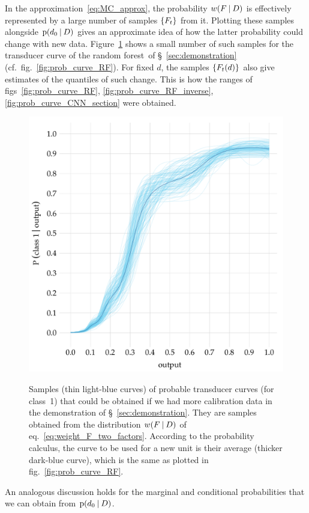 \documentclass[\ifafour a4paper,12pt,\else a5paper,10pt,\fi%
onecolumn,oneside,article,%
british%
]{memoir}
\theoremstyle{remark}
\theoremstyle{innote}
\DeclarePairedDelimiter\set{\{}{\}} %
\newcommand*{\p}{\mathrm{p}}%
\renewcommand*{\|}[1][]{\nonscript\:#1\vert\nonscript\:\mathopen{}}
\newcommand*{\sect}{\S}%
\newcommand*{\eqn}{eq.}%
\newcommand*{\fig}{fig.}%
\newcommand*{\figs}{figs}%
\newcommand*{\cf}{{cf.}}
\newcommand*{\wf}{w}
\newcommand*{\RF}{random forest}
\begin{document}
In the approximation~\eqref{eq:MC_approx}, the probability $\wf(F \| D)$ is effectively represented by a large number of samples $\set{F_{t}}$ from it. Plotting these samples alongside $\p(d_{0} \| D)$ gives an approximate idea of how the latter probability could change with new data. Figure~\ref{fig:prob_curve_RF_samples} shows a small number of such samples for the transducer curve of the \RF\ of \sect~\ref{sec:demonstration} (\cf\ \fig~\ref{fig:prob_curve_RF}). For fixed $d$, the samples $\set{F_{t}(d)}$ also give estimates of the quantiles of such change. This is how the ranges of \figs~\ref{fig:prob_curve_RF}, \ref{fig:prob_curve_RF_inverse}, \ref{fig:prob_curve_CNN_section} were obtained.
%
\begin{figure}[t]
  \centering
  \includegraphics[width=0.75\linewidth]{transducer_curve_RFraw_all.pdf}\\
  \caption{Samples (\textcolor{myblue}{thin light-blue curves}) of probable transducer curves (for class~1) that could be obtained if we had more calibration data in the demonstration of \sect~\ref{sec:demonstration}. They are samples obtained from the distribution $\wf(F \| D)$ of \eqn~\eqref{eq:weight_F_two_factors}. According to the probability calculus, the curve to be used for a new unit is their average (\textcolor{mypurpleblue}{thicker dark-blue curve}), which is the same as plotted in \fig~\ref{fig:prob_curve_RF}.}
  \label{fig:prob_curve_RF_samples}
\end{figure}





An analogous discussion holds for the marginal and conditional probabilities that we can obtain from $\p(d_{0} \| D)$.
\end{document}
